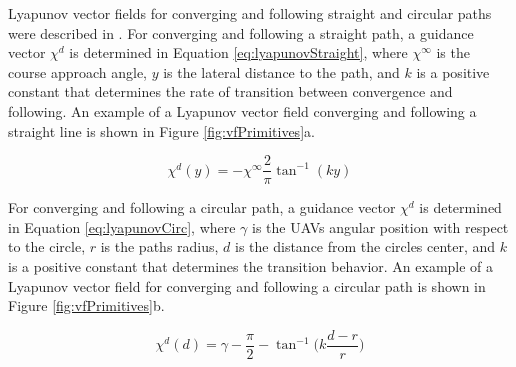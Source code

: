 \documentclass[conf]{new-aiaa}
\begin{document}
Lyapunov vector fields for converging and following straight and circular paths were described in \cite{nelson_cooperative_2005}. For converging and following a straight path, a guidance vector $\chi^{d}$ is determined in Equation \ref{eq:lyapunovStraight}, where $\chi^{\infty}$ is the course approach angle, $y$ is the lateral distance to the path, and $k$ is a positive constant that determines the rate of transition between convergence and following. An example of a Lyapunov vector field converging and following a straight line is shown in Figure \ref{fig:vfPrimitives}a.




\begin{equation}\label{eq:lyapunovStraight}
\chi^d(y) = -\chi^{\infty}\frac{2}{\pi}\tan^{-1}(ky)
\end{equation}



For converging and following a circular path, a guidance vector $\chi^{d}$ is determined in Equation \ref{eq:lyapunovCirc}, where $\gamma$ is the UAVs angular position with respect to the circle, $r$ is the paths radius, $d$ is the distance from the circles center, and $k$ is a positive constant that determines the transition behavior. An example of a Lyapunov vector field for converging and following a circular path is shown in Figure \ref{fig:vfPrimitives}b.

\begin{equation}\label{eq:lyapunovCirc}
\chi^d(d) = \gamma-\frac{\pi}{2}-\tan^{-1} \bigg(k \frac{d-r}{r} \bigg)
\end{equation}
\end{document}
